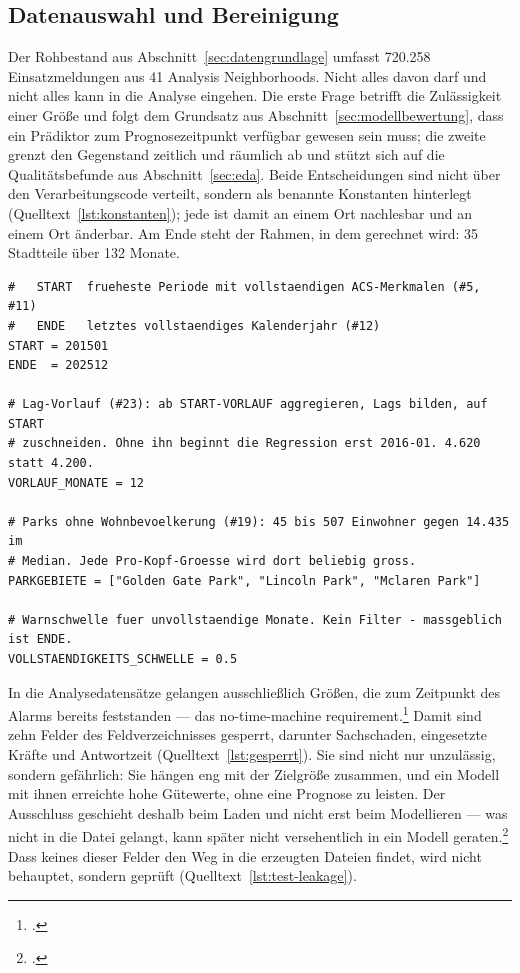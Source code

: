 
\subsection{Datenauswahl und Bereinigung}
\label{sec:auswahl-bereinigung}

Der Rohbestand aus Abschnitt~\ref{sec:datengrundlage} umfasst 720.258
Einsatzmeldungen aus 41 Analysis Neighborhoods. Nicht alles davon darf und
nicht alles kann in die Analyse eingehen. Die erste Frage betrifft die
Zulässigkeit einer Größe und folgt dem Grundsatz aus
Abschnitt~\ref{sec:modellbewertung}, dass ein Prädiktor zum Prognosezeitpunkt
verfügbar gewesen sein muss; die zweite grenzt den Gegenstand zeitlich und
räumlich ab und stützt sich auf die Qualitätsbefunde aus
Abschnitt~\ref{sec:eda}. Beide Entscheidungen sind nicht über den
Verarbeitungscode verteilt, sondern als benannte Konstanten hinterlegt
(Quelltext~\ref{lst:konstanten}); jede ist damit an einem Ort nachlesbar und an
einem Ort änderbar. Am Ende steht der Rahmen, in dem gerechnet wird: 35
Stadtteile über 132 Monate.

\begin{lstlisting}[style=pythonstil,
  label={lst:konstanten},
  caption={Zeitraum und Ausschlüsse als benannte Konstanten
           (\texttt{prep/config.py}, Z.~83--97)}]
#   START  frueheste Periode mit vollstaendigen ACS-Merkmalen (#5, #11)
#   ENDE   letztes vollstaendiges Kalenderjahr (#12)
START = 201501
ENDE  = 202512

# Lag-Vorlauf (#23): ab START-VORLAUF aggregieren, Lags bilden, auf START
# zuschneiden. Ohne ihn beginnt die Regression erst 2016-01. 4.620 statt 4.200.
VORLAUF_MONATE = 12

# Parks ohne Wohnbevoelkerung (#19): 45 bis 507 Einwohner gegen 14.435 im
# Median. Jede Pro-Kopf-Groesse wird dort beliebig gross.
PARKGEBIETE = ["Golden Gate Park", "Lincoln Park", "Mclaren Park"]

# Warnschwelle fuer unvollstaendige Monate. Kein Filter - massgeblich ist ENDE.
VOLLSTAENDIGKEITS_SCHWELLE = 0.5
\end{lstlisting}

In die Analysedatensätze gelangen ausschließlich Größen, die zum Zeitpunkt des
Alarms bereits feststanden --- das no-time-machine
requirement.\footcite[559]{Kaufman2011} Damit sind zehn Felder des
Feldverzeichnisses gesperrt, darunter Sachschaden, eingesetzte Kräfte und
Antwortzeit (Quelltext~\ref{lst:gesperrt}). Sie sind nicht nur unzulässig,
sondern gefährlich: Sie hängen eng mit der Zielgröße zusammen, und ein Modell
mit ihnen erreichte hohe Gütewerte, ohne eine Prognose zu leisten. Der
Ausschluss geschieht deshalb beim Laden und nicht erst beim Modellieren ---
was nicht in die Datei gelangt, kann später nicht versehentlich in ein Modell
geraten.\footcite[560]{Kaufman2011} Dass keines dieser Felder den Weg in die
erzeugten Dateien findet, wird nicht behauptet, sondern geprüft
(Quelltext~\ref{lst:test-leakage}).


